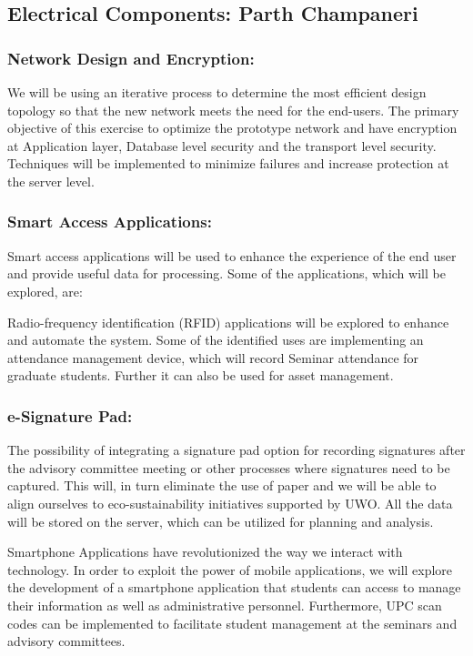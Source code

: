 \documentclass{journal}
\begin{document}
\subsection{ Electrical Components: Parth Champaneri }

\subsubsection{Network Design and Encryption:}

We will be using an iterative process to determine the most efficient design topology so that the new network meets the need for the end-users. The primary objective of this exercise to optimize the prototype network and have encryption at Application layer, Database level security and the transport level security. Techniques will be implemented to minimize failures and increase protection at the server level. 

\subsubsection{Smart Access Applications:} Smart access applications will be used to enhance the experience of the end user and provide useful data for processing. Some of the applications, which will be explored, are:

Radio-frequency identification (RFID) applications will be explored to enhance and automate the system. Some of the identified uses are implementing an attendance management device, which will record Seminar attendance for graduate students. Further it can also be used for asset management.

\subsubsection{e-Signature Pad:} The possibility of integrating a signature pad option for recording signatures after the advisory committee meeting or other processes where signatures need to be captured. This will, in turn eliminate the use of paper and we will be able to align ourselves to eco-sustainability initiatives supported by UWO. All the data will be stored on the server, which can be utilized for planning and analysis.

Smartphone Applications have revolutionized the way we interact with technology. In order to exploit the power of mobile applications, we will explore the development of a smartphone application that students can access to manage their information as well as administrative personnel. Furthermore, UPC scan codes can be implemented to facilitate student management at the seminars and advisory committees.
\end{document}
